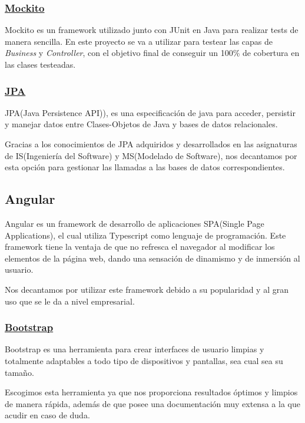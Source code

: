         
        \subsubsection{\underline{Mockito}}
        Mockito es un framework utilizado junto con JUnit en Java para realizar tests de manera sencilla. En este proyecto se va a utilizar para testear las capas de \emph{Business} y \emph{Controller}, con el objetivo final de conseguir un 100\% de cobertura en las clases testeadas.
        \newline
        

        \subsubsection{\underline{JPA}}
        JPA(Java Persistence API)), es una especificación de java para acceder, persistir y manejar datos entre Clases-Objetos de Java y bases de datos relacionales\cite{jpa}.
        \newline
        
        Gracias a los conocimientos de JPA adquiridos y desarrollados en las asignaturas de IS(Ingeniería del Software) y MS(Modelado de Software), nos decantamos por esta opción para gestionar las llamadas a las bases de datos correspondientes.
        

     \subsection{Angular}
       Angular es un framework de desarrollo de aplicaciones SPA(Single Page Applications), el cual utiliza Typescript como lenguaje de programación. Este framework tiene la ventaja de que no refresca el navegador al modificar los elementos de la página web, dando una sensación de dinamismo y de inmersión al usuario.
       \newline
       
       Nos decantamos por utilizar este framework debido a su popularidad y al gran uso que se le da a nivel empresarial.

        \subsubsection{\underline{Bootstrap}}
         Bootstrap es una herramienta para crear interfaces de usuario limpias y totalmente adaptables a todo tipo de dispositivos y pantallas, sea cual sea su tamaño\cite{bootstrap}.
         \newline
         
         Escogimos esta herramienta ya que nos proporciona resultados óptimos y limpios de manera rápida, además de que posee una documentación muy extensa a la que acudir en caso de duda\cite{documentationboostrap}.

   
     